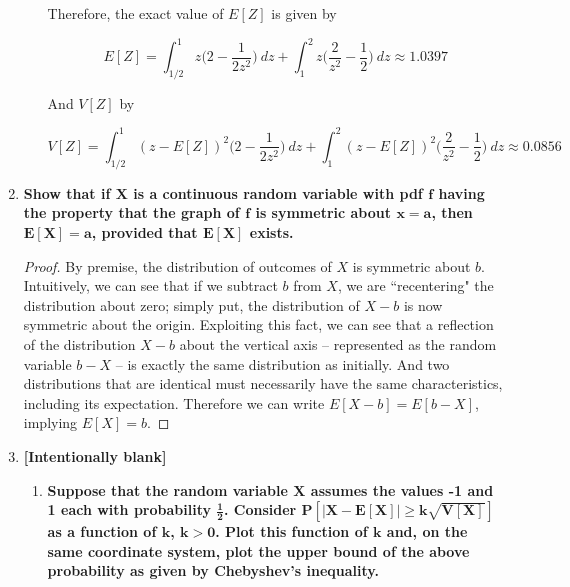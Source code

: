 \documentclass[10pt, oneside]{article}   	%
\theoremstyle{definition}
\begin{document}
\begin{enumerate}[label=7.\arabic*]
\begin{enumerate}
	  Therefore, the exact value of $E[Z]$ is given by
	  
	  \[ E[Z] = \int^1_{1/2} z \Big( 2 - \frac{1}{2z^2} \Big) \ dz + \int^2_1 z \Big( \frac{2}{z^2} - \frac{1}{2} \Big) \ dz \approx \boxed{1.0397} \]
	  
	  And $V[Z]$ by
	  
	  \[ V[Z] = \int^1_{1/2} (z - E[Z])^2 \Big( 2 - \frac{1}{2z^2} \Big) \ dz + \int^2_1 (z - E[Z])^2 \Big( \frac{2}{z^2} - \frac{1}{2} \Big) \ dz \approx \boxed{0.0856} \]
	  
	\end{enumerate}

\item  \begin{tcolorbox}[
  colback=Cerulean!5!white,
  colframe=Cerulean!75!black]
  \textbf{Show that if $\bm{X}$ is a continuous random variable with pdf $\bm{f}$ having the property that the graph of $\bm{f}$ is symmetric about $\bm{x = a}$, then $\bm{E[X] = a}$, provided that $\bm{E[X]}$ exists.}
  \end{tcolorbox}
  
  \begin{proof}
  By premise, the distribution of outcomes of $X$ is symmetric about $b$. Intuitively, we can see that if we subtract $b$ from $X$, we are ``recentering" the distribution about zero; simply put, the distribution of $X-b$ is now symmetric about the origin. Exploiting this fact, we can see that a reflection of the distribution $X-b$ about the vertical axis -- represented as the random variable $b - X$ -- is exactly the same distribution as initially. And two distributions that are identical must necessarily have the same characteristics, including its expectation. Therefore we can write $E[X - b] = E[b - X]$, implying $\boxed{E[X] = b}$.
  \end{proof}
  
\item  \begin{tcolorbox}[
  colback=Cerulean!5!white,
  colframe=Cerulean!75!black]
  \textbf{[Intentionally blank]}
  \end{tcolorbox}
  
  	\begin{enumerate}
	\item  \begin{tcolorbox}[
	  colback=Cerulean!5!white,
	  colframe=Cerulean!75!black]
	  \textbf{Suppose that the random variable $\bm{X}$ assumes the values -1 and 1 each with probability $\bm{\frac{1}{2}}$. Consider $\bm{P[|X - E[X]| \geq k \sqrt{V[X]}]}$ as a function of $\bm{k}$, $\bm{k > 0}$. Plot this function of $\bm{k}$ and, on the same coordinate system, plot the upper bound of the above probability as given by Chebyshev's inequality.} 
	  \end{tcolorbox}
	  

\end{enumerate}
\end{enumerate}
\end{document}
